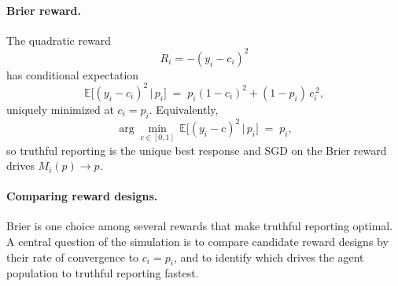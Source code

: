 \documentclass{article}
\begin{document}
\paragraph{Brier reward.} The quadratic reward
\[
R_i = -(y_i - c_i)^2
\]
has conditional expectation
\[
\mathbb{E}\!\big[(y_i - c_i)^2 \,\big|\, p_i\big] \;=\; p_i(1 - c_i)^2 + (1 - p_i)\,c_i^{\,2},
\]
uniquely minimized at $c_i = p_i$. Equivalently,
\[
\arg\min_{c \in [0,1]} \,\mathbb{E}\!\big[(y_i - c)^2 \,\big|\, p_i\big] \;=\; p_i,
\]
so truthful reporting is the unique best response and SGD on the Brier reward drives $M_i(p) \to p$.

\paragraph{Comparing reward designs.} Brier is one choice among several rewards that make truthful reporting optimal. A central question of the simulation is to compare candidate reward designs by their rate of convergence to $c_i = p_i$, and to identify which drives the agent population to truthful reporting fastest.
\end{document}
